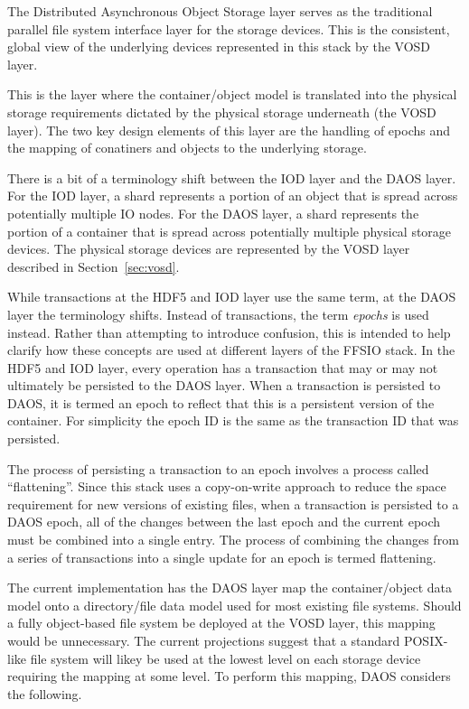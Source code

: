 \documentclass[conference]{IEEEtran}
\begin{document}
The Distributed Asynchronous Object Storage layer serves as the traditional
parallel file system interface layer for the storage devices. This is the
consistent, global view of the underlying devices represented in this stack
by the VOSD layer.

This is the layer where the container/object model is translated into the
physical storage requirements dictated by the physical storage underneath (the
VOSD layer). The two key design elements of this layer are the handling of
epochs and the mapping of conatiners and objects to the underlying storage.

There is a bit of a terminology shift between the IOD layer and the DAOS
layer. For the IOD layer, a shard represents a portion of an object that is
spread across potentially multiple IO nodes. For the DAOS layer, a shard
represents the portion of a container that is spread across potentially
multiple physical storage devices.  The physical storage devices are
represented by the VOSD layer described in Section~\ref{sec:vosd}.

While transactions at the HDF5 and IOD layer use the same term, at the DAOS
layer the terminology shifts. Instead of transactions, the term {\em epochs}
is used instead. Rather than attempting to introduce confusion, this is intended
to help clarify how these concepts are used at different layers of the FFSIO
stack. In the HDF5 and IOD layer, every operation has a transaction that may
or may not ultimately be persisted to the DAOS layer. When a transaction is
persisted to DAOS, it is termed an epoch to reflect that this is a persistent
version of the container. For simplicity the epoch ID is the same as the
transaction ID that was persisted.

The process of persisting a transaction to an epoch involves a process called
``flattening''. Since this stack uses a copy-on-write approach to reduce the
space requirement for new versions of existing files, when a transaction is
persisted to a DAOS epoch, all of the changes between the last epoch and the
current epoch must be combined into a single entry. The process of combining
the changes from a series of transactions into a single update for an epoch
is termed flattening.

The current implementation has the DAOS layer map the container/object data
model onto a directory/file data model used for most existing file systems.
Should a fully object-based file system be deployed at the VOSD layer, this
mapping would be unnecessary. The current projections suggest that a standard
POSIX-like file system will likey be used at the lowest level on each storage
device requiring the mapping at some level. To perform this mapping, DAOS
considers the following.
\end{document}
